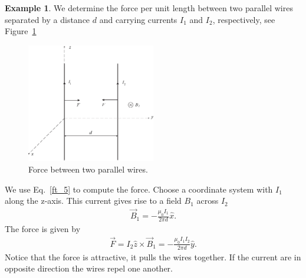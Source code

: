 \documentclass[11pt,a4paper,oneside]{book}
\numberwithin{equation}{section}
\theoremstyle{it}
\theoremstyle{definition}
\newtheorem{example}{Example}[section]
\begin{document}
\begin{example}
	We determine the force per unit length between two parallel wires separated by a distance $d$ and carrying currents $I_1$ and $I_2$, respectively, see Figure~\ref{example_327_1}
	\begin{figure}[H]
		\centering
		\includegraphics[width = 0.5\textwidth, width = 250pt, angle = 0, keepaspectratio]{figures/force_two_wire.eps}
		\captionsetup{width=0.75\textwidth}		
		\caption{Force between two parallel wires.}
		\label{example_327_1}
	\end{figure}
We use Eq.~\eqref{ft_5} to compute the force. Choose a coordinate system with $I_1$ along the z-axis. This current gives rise to a field $B_1$ across $I_2$
\begin{equation*}\label{}
	\begin{aligned}
		\vec{B}_1=-\frac{\mu_0I_1}{2\pi d}\hat{x}.
	\end{aligned}
\end{equation*}
The force is given by
\begin{equation}\label{example_327_2}
	\begin{aligned}
		\vec{F}=I_2\hat{z}\times\vec{B}_1 =  -\frac{\mu_0I_1I_2}{2\pi d}\hat{y}.
	\end{aligned}
\end{equation}
Notice that the force is attractive, it pulls the wires together. If the current are in opposite direction the wires repel one another. 
\end{example}
\end{document}
